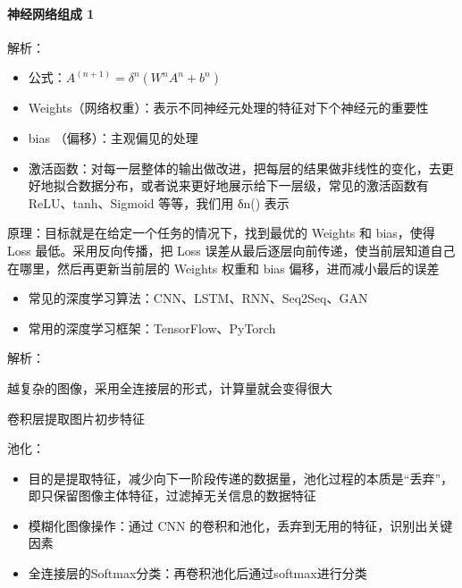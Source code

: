 \documentclass[letterpaper,10pt,english]{sphinxmanual}
\begin{document}
\paragraph{神经网络组成 1\sphinxfootnotemark[942]}
\label{\detokenize{chapter_AI_dive/DL:id2}}%
\begin{footnotetext}[942]\sphinxAtStartFootnote
{}
%
\end{footnotetext}\ignorespaces 
解析：
\begin{itemize}
\item {} 
公式：\(A^{(n+1)}=\delta^{n}\left(W^{n} A^{n}+b^{n}\right)\)

\item {} 
Weights（网络权重）：表示不同神经元处理的特征对下个神经元的重要性

\item {} 
bias （偏移）：主观偏见的处理

\item {} 
激活函数：对每一层整体的输出做改进，把每层的结果做非线性的变化，去更好地拟合数据分布，或者说来更好地展示给下一层级，常见的激活函数有
ReLU、tanh、Sigmoid 等等，我们用 δn() 表示

\end{itemize}

原理：目标就是在给定一个任务的情况下，找到最优的 Weights 和 bias，使得
Loss 最低。采用反向传播，把 Loss
误差从最后逐层向前传递，使当前层知道自己在哪里，然后再更新当前层的
Weights 权重和 bias 偏移，进而减小最后的误差
\begin{itemize}
\item {} 
常见的深度学习算法：CNN、LSTM、RNN、Seq2Seq、GAN

\item {} 
常用的深度学习框架：TensorFlow、PyTorch

\end{itemize}

解析：

越复杂的图像，采用全连接层的形式，计算量就会变得很大

卷积层提取图片初步特征%
\begin{footnote}[943]\sphinxAtStartFootnote
{}
%
\end{footnote}

池化：
\begin{itemize}
\item {} 
目的是提取特征，减少向下一阶段传递的数据量，池化过程的本质是“丢弃”，即只保留图像主体特征，过滤掉无关信息的数据特征

\item {} 
模糊化图像操作：通过 CNN
的卷积和池化，丢弃到无用的特征，识别出关键因素

\item {} 
全连接层的Softmax分类：再卷积池化后通过softmax进行分类

\end{itemize}
\end{document}
